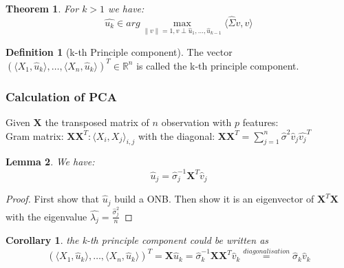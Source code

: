 \documentclass[a4paper,12pt, oneside, fleqn]{book}
\newtheorem{theorem}{Theorem}[section]
\newtheorem{corollary}{Corollary}[theorem]
\newtheorem{lemma}[theorem]{Lemma}
\theoremstyle{definition}
\newtheorem{definition}{Definition}[section]
\theoremstyle{remark}
\begin{document}
\begin{theorem}
	For $k > 1$ we have:
	\begin{equation}
		\hat{u_k} \in  arg\max_{\|v\| = 1, v \perp \hat{u}_1, \dots, \hat{u}_{k - 1}} \langle \hat{\Sigma} v, v \rangle
	\end{equation}
\end{theorem}

\begin{definition}[k-th Principle component]
	The vector $(\langle X_1, \hat{u}_k \rangle, \dots, \langle X_n, \hat{u}_k \rangle )^T \in \mathbb{R}^n$ is called the k-th principle component.
\end{definition}

\subsubsection*{Calculation of PCA}
Given $\mathbf{X}$ the transposed matrix of $n$ observation with $p$ features:\\
Gram matrix: $\mathbf{X} \mathbf{X}^T : \langle X_i, X_j \rangle_{i, j}$ with the diagonal: $\mathbf{X} \mathbf{X}^T  = \sum_{j = 1}^n \hat{\sigma}^2 \hat{v}_j \hat{v_j}^T$ \\



\begin{lemma}
	We have:
	\begin{equation*}
		\hat{u}_j = \hat{\sigma}_j^{-1} \mathbf{X}^T \hat{v}_j
	\end{equation*}
\end{lemma}

\begin{proof}
	First show that $\hat{u}_j$ build a ONB. Then show it is an eigenvector of $\mathbf{X}^T \mathbf{X}$ with the eigenvalue $\hat{\lambda_j} = \frac{\hat{\sigma}_j^2}{n}$
\end{proof}

\begin{corollary}
	the k-th principle component could be written as 
	\begin{equation} \label{PCA k.}
		(\langle X_1, \hat{u}_k \rangle, \dots, \langle X_n, \hat{u}_k \rangle)^T = \mathbf{X} \hat{u}_k = \hat{\sigma}_k^{-1} \mathbf{X} \mathbf{X}^T \hat{v}_k \overset{diagonalisation}{=} \hat{\sigma}_k \hat{v}_k
	\end{equation}
\end{corollary}
\end{document}

